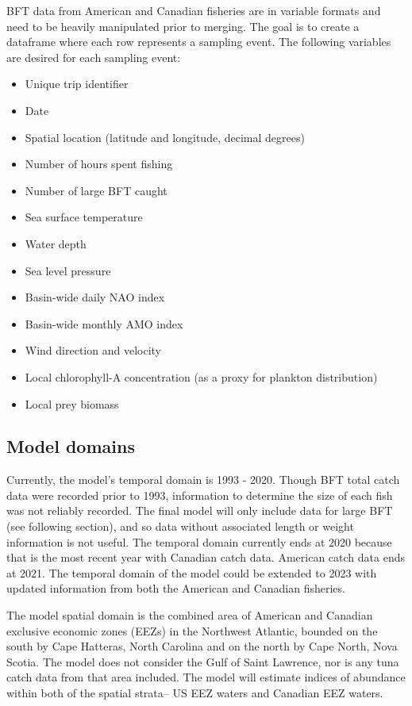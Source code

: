 \documentclass[
]{article}
\providecommand{\tightlist}{%
  \setlength{\itemsep}{0pt}\setlength{\parskip}{0pt}}
\begin{document}
BFT data from American and Canadian fisheries are in variable formats and need to be heavily manipulated prior to merging. The goal is to create a dataframe where each row represents a sampling event. The following variables are desired for each sampling event:

\begin{itemize}
\tightlist
\item
  Unique trip identifier
\item
  Date
\item
  Spatial location (latitude and longitude, decimal degrees)
\item
  Number of hours spent fishing
\item
  Number of large BFT caught
\item
  Sea surface temperature
\item
  Water depth
\item
  Sea level pressure
\item
  Basin-wide daily NAO index
\item
  Basin-wide monthly AMO index
\item
  Wind direction and velocity
\item
  Local chlorophyll-A concentration (as a proxy for plankton distribution)
\item
  Local prey biomass
\end{itemize}

\hypertarget{model-domains}{%
\subsection{Model domains}\label{model-domains}}

Currently, the model's temporal domain is 1993 - 2020. Though BFT total catch data were recorded prior to 1993, information to determine the size of each fish was not reliably recorded. The final model will only include data for large BFT (see following section), and so data without associated length or weight information is not useful. The temporal domain currently ends at 2020 because that is the most recent year with Canadian catch data. American catch data ends at 2021. The temporal domain of the model could be extended to 2023 with updated information from both the American and Canadian fisheries.

The model spatial domain is the combined area of American and Canadian exclusive economic zones (EEZs) in the Northwest Atlantic, bounded on the south by Cape Hatteras, North Carolina and on the north by Cape North, Nova Scotia. The model does not consider the Gulf of Saint Lawrence, nor is any tuna catch data from that area included. The model will estimate indices of abundance within both of the spatial strata-- US EEZ waters and Canadian EEZ waters.
\end{document}
